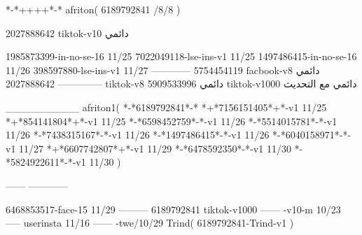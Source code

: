 *-*++++*-*
afriton(
6189792841 /8/8
)

2027888642 tiktok-v10
دائمي

1985873399-in-no-se-16 11/25
7022049118-lse-ins-v1 11/25
1497486415-in-no-se-16 11/26
398597880-lse-ins-v1 11/27
------------
5754454119 facbook-v8
دائمي
--------------
2027888642 tiktok-v8
دائمي
5909533996 tiktok-v1000
دائمي مع التحديث

__________
afriton1(
*-*6189792841*-*
*+*7156151405*+*-v1 11/25
*+*854141804*+*-v1 11/25
*-*6598452759*-*-v1 11/26
*-*5514015781*-*-v1 11/26
*-*7438315167*-*-v1 11/26
*-*1497486415*-*-v1 11/26
*-*6040158971*-*-v1 11/27
*+*6607742807*+*-v1 11/29
*-*6478592350*-*-v1 11/30
*-*5824922611*-*-v1 11/30
)

------
------------

6468853517-face-15 11/29
---------
6189792841 tiktok-v1000
------
-v10-m 10/23
-----
userinsta 11/16
------
-twe/10/29
Trind(
6189792841-Trind-v1 
)
